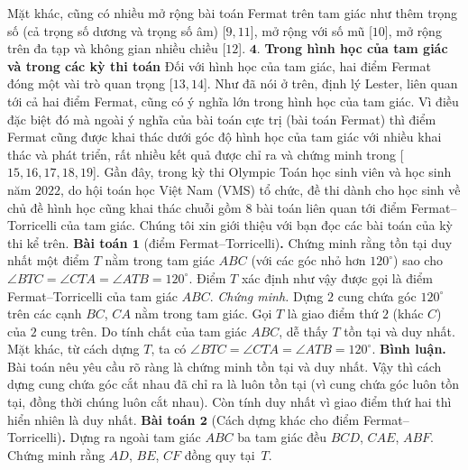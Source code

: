 \begin{multicols}{2}
	Mặt khác, cũng có nhiều mở rộng bài toán Fermat trên tam giác như thêm trọng số (cả trọng số dương và trọng số âm) [$9, 11$], mở rộng với số mũ [$10$], mở rộng trên đa tạp và không gian nhiều chiều [$12$].
	\vskip 0.1cm
	$\pmb{4.}$ \textbf{\color{cackithi}Trong hình học của tam giác và trong các kỳ thi toán}
	\vskip 0.1cm
	Đối với hình học của tam giác, hai điểm Fermat đóng một vài trò quan trọng [$13,14$]. Như đã nói ở trên, định lý Lester, liên quan tới cả hai điểm Fermat, cũng có ý nghĩa lớn trong hình học của tam giác. Vì điều đặc biệt đó mà ngoài ý nghĩa của bài toán cực trị (bài toán Fermat) thì điểm Fermat cũng được khai thác dưới góc độ hình học của tam giác với nhiều khai thác và phát triển, rất nhiều kết quả được chỉ ra và chứng minh trong [$15,16,17,18,19$].
	\vskip 0.1cm
	Gần đây, trong kỳ thi Olympic Toán học sinh viên và học sinh năm $2022$, do hội toán học Việt Nam (VMS) tổ chức, đề thi dành cho học sinh về chủ đề hình học cũng khai thác chuỗi gồm $8$ bài toán liên quan tới điểm Fermat--Torricelli của tam giác. Chúng tôi xin giới thiệu với bạn đọc các bài toán của kỳ thi kể trên.
	\vskip 0.1cm
	\textbf{\color{cackithi}Bài toán $\pmb{1}$} (điểm Fermat--Torricelli)\textbf{\color{cackithi}.} Chứng minh rằng tồn tại duy nhất một điểm $T$ nằm trong tam giác $ABC$ (với các góc nhỏ hơn $120^\circ$) sao cho $\angle BTC = \angle CTA = \angle ATB=120^{\circ}$. Điểm $T$ xác định như vậy được gọi là điểm Fermat--Torricelli của tam giác $ABC$. 
	\vskip 0.1cm
	\textit{Chứng minh.} Dựng $2$ cung chứa góc  $120^\circ$ trên các cạnh $BC$, $CA$  nằm trong tam giác. Gọi $T $ là giao điểm thứ $2$ (khác $C$) của $2$ cung trên. Do tính chất của tam giác $ABC$, dễ thấy $T$ tồn tại và duy nhất. Mặt khác, từ cách dựng $T$, ta có  $\angle BTC = \angle CTA = \angle ATB=120^{\circ}$.
	\vskip 0.1cm
	{\bf\color{cackithi} Bình luận.} Bài toán nêu yêu cầu rõ ràng là chứng minh tồn tại và duy nhất. Vậy thì cách dựng cung chứa góc cắt nhau đã chỉ ra là luôn tồn tại (vì cung chứa góc luôn tồn tại, đồng thời chúng luôn cắt nhau). Còn tính duy nhất vì giao điểm thứ hai thì hiển nhiên là duy nhất.
	\vskip 0.1cm
	\textbf{\color{cackithi}Bài toán $\pmb{2}$} (Cách dựng khác cho điểm Fermat--Torricelli)\textbf{\color{cackithi}.} Dựng ra ngoài tam giác $ABC$ ba tam giác đều $BCD$, $CAE$, $ABF$. Chứng minh rằng $AD$, $BE$, $CF$ đồng quy tại~$T$.
	\begin{figure}[H]
		\vspace*{-5pt}
		\centering
		\captionsetup{labelformat= empty, justification=centering}

\end{figure}
\end{multicols}
